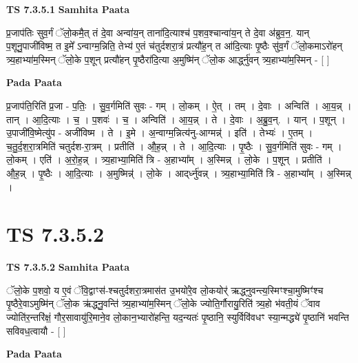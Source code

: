 \documentclass[17pt]{extarticle}
\begin{document}
\textbf{TS 7.3.5.1 } \newline
\textbf{Samhita Paata} \newline

प्र॒जाप॑तिः सुव॒र्गं ॅलो॒कमै॒त् तं दे॒वा अन्वा॑य॒न् ताना॑दि॒त्याश्च॑ प॒शव॒श्चान्वा॑य॒न् ते दे॒वा अ॑ब्रुव॒न॒. यान् प॒शूनु॒पाजी॑विष्म॒ त इ॒मे᳚ ऽन्वाग्म॒न्निति॒ तेभ्य॑ ए॒तं च॑तुर्दशरा॒त्रं प्रत्यौ॑ह॒न् त आ॑दि॒त्याः पृ॒ष्ठैः सु॑व॒र्गं ॅलो॒कमाऽरो॑हन् त्र्य॒हाभ्या॑म॒स्मिन् ॅलो॒के प॒शून् प्रत्यौ॑हन् पृ॒ष्ठैरा॑दि॒त्या अ॒मुष्मि॑न् ॅलो॒क आर्द्ध्नु॑वन् त्र्य॒हाभ्या॑म॒स्मिन् - [  ] \newline

\textbf{Pada Paata} \newline

प्र॒जाप॑ति॒रिति॑ प्र॒जा - प॒तिः॒ । सु॒व॒र्गमिति॑ सुवः - गम् । लो॒कम् । ऐ॒त् । तम् । दे॒वाः । अन्विति॑ । आ॒य॒न्न् । तान् । आ॒दि॒त्याः । च॒ । प॒शवः॑ । च॒ । अन्विति॑ । आ॒य॒न्न् । ते । दे॒वाः । अ॒ब्रु॒व॒न्. । यान् । प॒शून् । उ॒पाजी॑वि॒ष्मेत्यु॑प - अजी॑विष्म । ते । इ॒मे । अ॒न्वाग्म॒न्नित्य॑नु-आग्मन्न्॑ । इति॑ । तेभ्यः॑ । ए॒तम् । च॒तु॒र्द॒श॒रा॒त्रमिति॑ चतुर्दश-रा॒त्रम् । प्रतीति॑ । औ॒ह॒न्न् । ते । आ॒दि॒त्याः । पृ॒ष्ठैः । सु॒व॒र्गमिति॑ सुवः - गम् । लो॒कम् । एति॑ । अ॒रो॒ह॒न्न् । त्र्य॒हाभ्या॒मिति॑ त्रि - अ॒हाभ्या᳚म् । अ॒स्मिन्न् । लो॒के । प॒शून् । प्रतीति॑ । औ॒ह॒न्न् । पृ॒ष्ठैः । आ॒दि॒त्याः । अ॒मुष्मिन्न्॑ । लो॒के । आद्‌र्ध्नु॑वन्न् । त्र्य॒हाभ्या॒मिति॑ त्रि - अ॒हाभ्या᳚म् । अ॒स्मिन्न् ।  \newline





\section{ TS 7.3.5.2 }

\textbf{TS 7.3.5.2 } \newline
\textbf{Samhita Paata} \newline

ॅलो॒के प॒शवो॒ य ए॒वं ॅवि॒द्वाꣳस॑-श्चतुर्दशरा॒त्रमास॑त उ॒भयो॑रे॒व लो॒कयोर्॑ ऋद्ध्नुवन्त्य॒स्मिꣳश्चा॒मुष्मिꣳ॑श्च पृ॒ष्ठैरे॒वाऽमुष्मि॑न् ॅलो॒क ऋ॑द्ध्नु॒वन्ति॑ त्र्य॒हाभ्या॑म॒स्मिन् ॅलो॒के ज्योति॒र्गौरायु॒रिति॑ त्र्य॒हो भ॑वती॒यं ॅवाव ज्योति॑र॒न्तरि॑क्षं॒ गौर॒सावायु॑रि॒माने॒व लो॒कान॒भ्यारो॑हन्ति॒ यद॒न्यतः॑ पृ॒ष्ठानि॒ स्युर्विवि॑वधꣳ स्या॒न्मद्ध्ये॑ पृ॒ष्ठानि॑ भवन्ति सविवध॒त्वायौ - [  ] \newline

\textbf{Pada Paata} \newline
\end{document}
